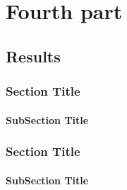 \part{Fourth part}
\chapter{Results}

\section{Section Title}

\subsection{SubSection Title}

\section{Section Title}


\subsection{SubSection Title}

